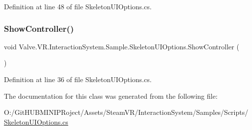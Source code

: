Definition at line 48 of file Skeleton\+U\+I\+Options.\+cs.

\mbox{\label{class_valve_1_1_v_r_1_1_interaction_system_1_1_sample_1_1_skeleton_u_i_options_a6d373a2d4fc1764ef4e7eaefa37f3388}} 
\subsubsection{\texorpdfstring{ShowController()}{ShowController()}}
{\footnotesize\ttfamily void Valve.\+V\+R.\+Interaction\+System.\+Sample.\+Skeleton\+U\+I\+Options.\+Show\+Controller (\begin{DoxyParamCaption}{ }\end{DoxyParamCaption})}



Definition at line 36 of file Skeleton\+U\+I\+Options.\+cs.



The documentation for this class was generated from the following file\+:\begin{DoxyCompactItemize}
\item 
O\+:/\+Git\+H\+U\+B\+M\+I\+N\+I\+P\+Roject/\+Assets/\+Steam\+V\+R/\+Interaction\+System/\+Samples/\+Scripts/\mbox{\hyperlink{_skeleton_u_i_options_8cs}{Skeleton\+U\+I\+Options.\+cs}}\end{DoxyCompactItemize}
